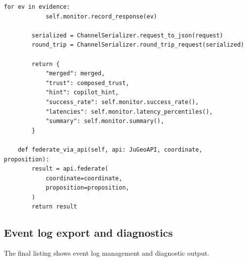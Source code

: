 \documentclass[11pt]{article}
\begin{document}
\begin{lstlisting}[style=jugeo-python,
  caption={Federated bridge operation},
  label={lst:fedbridge}]
        for ev in evidence:
            self.monitor.record_response(ev)

        serialized = ChannelSerializer.request_to_json(request)
        round_trip = ChannelSerializer.round_trip_request(serialized)

        return {
            "merged": merged,
            "trust": composed_trust,
            "hint": copilot_hint,
            "success_rate": self.monitor.success_rate(),
            "latencies": self.monitor.latency_percentiles(),
            "summary": self.monitor.summary(),
        }

    def federate_via_api(self, api: JuGeoAPI, coordinate, proposition):
        result = api.federate(
            coordinate=coordinate,
            proposition=proposition,
        )
        return result
\end{lstlisting}

\subsection{Event log export and diagnostics}

The final listing shows event log management and
diagnostic output.
\end{document}
